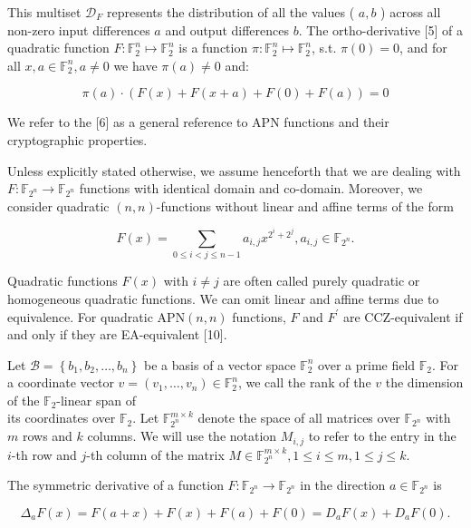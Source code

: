 \documentclass[10pt]{article}
\begin{document}
This multiset $\mathcal{D}_{F}$ represents the distribution of all the values ( $a, b$ ) across all non-zero input differences $a$ and output differences $b$. The ortho-derivative [5] of a quadratic function $F: \mathbb{F}_{2}^{n} \mapsto \mathbb{F}_{2}^{n}$ is a function $\pi: \mathbb{F}_{2}^{n} \mapsto \mathbb{F}_{2}^{n}$, s.t. $\pi(0)=0$, and for all $x, a \in \mathbb{F}_{2}^{n}, a \neq 0$ we have $\pi(a) \neq 0$ and:

$$
\pi(a) \cdot(F(x)+F(x+a)+F(0)+F(a))=0
$$

We refer to the [6] as a general reference to APN functions and their cryptographic properties.

Unless explicitly stated otherwise, we assume henceforth that we are dealing with $F: \mathbb{F}_{2^{n}} \rightarrow \mathbb{F}_{2^{n}}$ functions with identical domain and co-domain. Moreover, we consider quadratic $(n, n)$-functions without linear and affine terms of the form


\begin{equation*}
F(x)=\sum_{0 \leq i<j \leq n-1} a_{i, j} x^{2^{i}+2^{j}}, a_{i, j} \in \mathbb{F}_{2^{n}} . \tag{1}
\end{equation*}


Quadratic functions $F(x)$ with $i \neq j$ are often called purely quadratic or homogeneous quadratic functions. We can omit linear and affine terms due to equivalence. For quadratic $\mathrm{APN}(n, n)$ functions, $F$ and $F^{\prime}$ are CCZ-equivalent if and only if they are EA-equivalent [10].

Let $\mathcal{B}=\left\{b_{1}, b_{2}, \ldots, b_{n}\right\}$ be a basis of a vector space $\mathbb{F}_{2}^{n}$ over a prime field $\mathbb{F}_{2}$. For a coordinate vector $v=\left(v_{1}, \ldots, v_{n}\right) \in \mathbb{F}_{2}^{n}$, we call the rank of the $v$ the dimension of the $\mathbb{F}_{2}$-linear span of\\
its coordinates over $\mathbb{F}_{2}$. Let $\mathbb{F}_{2^{n}}^{m \times k}$ denote the space of all matrices over $\mathbb{F}_{2^{n}}$ with $m$ rows and $k$ columns. We will use the notation $M_{i, j}$ to refer to the entry in the $i$-th row and $j$-th column of the matrix $M \in \mathbb{F}_{2^{n}}^{m \times k}, 1 \leq i \leq m, 1 \leq j \leq k$.

The symmetric derivative of a function $F: \mathbb{F}_{2^{n}} \rightarrow \mathbb{F}_{2^{n}}$ in the direction $a \in \mathbb{F}_{2^{n}}$ is


\begin{equation*}
\Delta_{a} F(x)=F(a+x)+F(x)+F(a)+F(0)=D_{a} F(x)+D_{a} F(0) . \tag{2}
\end{equation*}
\end{document}
